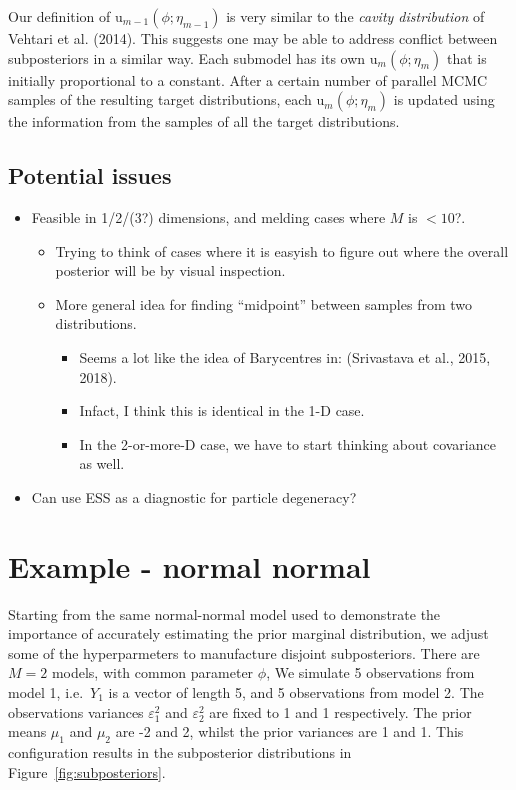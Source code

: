 \documentclass[10pt,a4paper,]{article}
\providecommand{\tightlist}{%
  \setlength{\itemsep}{0pt}\setlength{\parskip}{0pt}}
\newcommand{\tarw}{\text{u}}
\newcommand{\Nm}{M}
\newcommand{\modelindex}{m}
\begin{document}
Our definition of
\(\tarw_{\modelindex - 1}(\phi; \eta_{\modelindex - 1})\) is very
similar to the \emph{cavity distribution} of Vehtari et al. (2014). This
suggests one may be able to address conflict between subposteriors in a
similar way. Each submodel has its own
\(\tarw_{\modelindex}(\phi; \eta_{\modelindex})\) that is initially
proportional to a constant. After a certain number of parallel MCMC
samples of the resulting target distributions, each
\(\tarw_{\modelindex}(\phi; \eta_{\modelindex})\) is updated using the
information from the samples of all the target distributions.

\subsection{Potential issues}\label{potential-issues}

\begin{itemize}
\tightlist
\item
  Feasible in 1/2/(3?) dimensions, and melding cases where \(\Nm\) is
  \(<10\)?.

  \begin{itemize}
  \tightlist
  \item
    Trying to think of cases where it is easyish to figure out where the
    overall posterior will be by visual inspection.
  \item
    More general idea for finding ``midpoint'' between samples from two
    distributions.

    \begin{itemize}
    \tightlist
    \item
      Seems a lot like the idea of Barycentres in: (Srivastava et al.,
      2015, 2018).
    \item
      Infact, I think this is identical in the 1-D case.
    \item
      In the 2-or-more-D case, we have to start thinking about
      covariance as well.
    \end{itemize}
  \end{itemize}
\item
  Can use ESS as a diagnostic for particle degeneracy?
\end{itemize}

\section{Example - normal normal}\label{example---normal-normal}

Starting from the same normal-normal model used to demonstrate the
importance of accurately estimating the prior marginal distribution, we
adjust some of the hyperparmeters to manufacture disjoint subposteriors.
There are \(\Nm = 2\) models, with common parameter \(\phi\),
 We simulate 5
observations from model 1, i.e.~\(Y_{1}\) is a vector of length 5, and 5
observations from model 2. The observations variances
\(\varepsilon_{1}^{2}\) and \(\varepsilon_{2}^{2}\) are fixed to 1 and 1
respectively. The prior means \(\mu_{1}\) and \(\mu_{2}\) are -2 and 2,
whilst the prior variances are 1 and 1. This configuration results in
the subposterior distributions in Figure~\ref{fig:subposteriors}.
\end{document}
